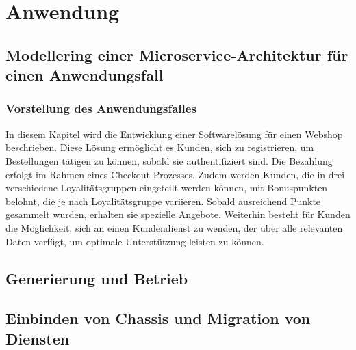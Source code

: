 \chapter{Anwendung}

\section{Modellering einer Microservice-Architektur für einen Anwendungsfall}

\subsection{Vorstellung des Anwendungsfalles}

In diesem Kapitel wird die Entwicklung einer Softwarelösung für einen Webshop beschrieben. Diese Lösung ermöglicht es Kunden, sich zu registrieren, um Bestellungen tätigen zu können, sobald sie authentifiziert sind. Die Bezahlung erfolgt im Rahmen eines Checkout-Prozesses. Zudem werden Kunden, die in drei verschiedene Loyalitätsgruppen eingeteilt werden können, mit Bonuspunkten belohnt, die je nach Loyalitätsgruppe variieren. Sobald ausreichend Punkte gesammelt wurden, erhalten sie spezielle Angebote. Weiterhin besteht für Kunden die Möglichkeit, sich an einen Kundendienst zu wenden, der über alle relevanten Daten verfügt, um optimale Unterstützung leisten zu können.

\section{Generierung und Betrieb}

\section{Einbinden von Chassis und Migration von Diensten}